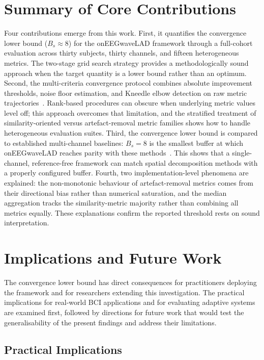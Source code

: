 \documentclass[MScCS,12pt,oneside,final]{uccthesis}
\begin{document}
\section{Summary of Core Contributions}
\label{sec:core_contributions}
Four contributions emerge from this work. First, it quantifies the convergence lower bound ($B_s \approx 8$) for the onEEGwaveLAD framework through a full-cohort evaluation across thirty subjects, thirty channels, and fifteen heterogeneous metrics. The two-stage grid search strategy provides a methodologically sound approach when the target quantity is a lower bound rather than an optimum. Second, the multi-criteria convergence protocol combines absolute improvement thresholds, noise floor estimation, and Kneedle elbow detection on raw metric trajectories~\parencite{satopaa2011finding}. Rank-based procedures can obscure when underlying metric values level off; this approach overcomes that limitation, and the stratified treatment of similarity-oriented versus artefact-removal metric families shows how to handle heterogeneous evaluation suites. Third, the convergence lower bound is compared to established multi-channel baselines: $B_s = 8$ is the smallest buffer at which onEEGwaveLAD reaches parity with these methods~\parencite{nolan2010faster, mullen2015real}. This shows that a single-channel, reference-free framework can match spatial decomposition methods with a properly configured buffer. Fourth, two implementation-level phenomena are explained: the non-monotonic behaviour of artefact-removal metrics comes from their directional bias rather than numerical saturation, and the median aggregation tracks the similarity-metric majority rather than combining all metrics equally. These explanations confirm the reported threshold rests on sound interpretation.

\section{Implications and Future Work}
\label{sec:implications_future}

The convergence lower bound has direct consequences for practitioners deploying the framework and for researchers extending this investigation. The practical implications for real-world BCI applications and for evaluating adaptive systems are examined first, followed by directions for future work that would test the generalisability of the present findings and address their limitations.

\subsection{Practical Implications}
\end{document}
